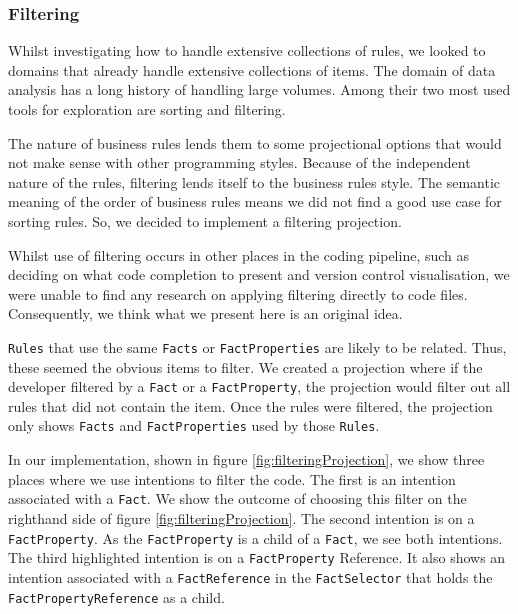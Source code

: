 \subsubsection{Filtering}
Whilst investigating how to handle extensive collections of rules, we looked to domains that already handle extensive collections of items.
The domain of data analysis has a long history of handling large volumes.
Among their two most used tools for exploration are sorting and filtering.

The nature of business rules lends them to some projectional options that would not make sense with other programming styles.
Because of the independent nature of the rules, filtering lends itself to the business rules style.
The semantic meaning of the order of business rules means we did not find a good use case for sorting rules.
So, we decided to implement a filtering projection.

Whilst use of filtering occurs in other places in the coding pipeline, such as deciding on what code completion to present\cite{hou2010towards} and version control visualisation\cite{yoon2013visualization}, we were unable to find any research on applying filtering directly to code files.
Consequently, we think what we present here is an original idea.

\texttt{Rules} that use the same \texttt{Facts} or \texttt{FactProperties} are likely to be related.
Thus, these seemed the obvious items to filter.
We created a projection where if the developer filtered by a \texttt{Fact} or a \texttt{FactProperty}, the projection would filter out all rules that did not contain the item.
Once the rules were filtered, the projection only shows \texttt{Facts} and \texttt{FactProperties} used by those \texttt{Rules}.

In our implementation, shown in figure \ref{fig:filteringProjection}, we show three places where we use intentions to filter the code.
The first is an intention associated with a \texttt{Fact}.
We show the outcome of choosing this filter on the righthand side of figure \ref{fig:filteringProjection}.
The second intention is on a \texttt{FactProperty}.
As the \texttt{FactProperty} is a child of a \texttt{Fact}, we see both intentions.
The third highlighted intention is on a \texttt{FactProperty} Reference.
It also shows an intention associated with a \texttt{FactReference} in the \texttt{FactSelector} that holds the \texttt{FactPropertyReference} as a child.

